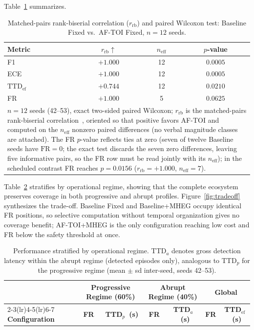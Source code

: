 \documentclass[a4paper,fleqn]{cas-dc}
\begin{document}
Table~\ref{tab:cliff_delta} summarizes.
\begin{table}[!tbp]
\centering
\caption{{\color{\revcolor}Matched-pairs rank-biserial correlation
($r_{\mathrm{rb}}$)} and paired Wilcoxon test: Baseline Fixed vs.\ \mbox{AF-TOI} Fixed{\color{\revcolor}, $n=12$ seeds}.}
\label{tab:cliff_delta}
\footnotesize
\setlength{\tabcolsep}{5pt}
\renewcommand{\arraystretch}{1.15}
{\color{\revcolor}
\begin{tabular}{l c c c}
\toprule
\textbf{Metric} & \textbf{$r_{\mathrm{rb}}$}$\uparrow$
  & \textbf{$n_{\mathrm{eff}}$} & \textbf{$p$-value} \\
\midrule
F1  & $+1.000$ & 12 & $0.0005$ \\
ECE & $+1.000$ & 12 & $0.0005$ \\
$\mathrm{TTD}_{\mathrm{ef}}$ & $+0.744$ & 12 & $0.0210$ \\
FR  & $+1.000$ & 5 & $0.0625$ \\
\bottomrule
\multicolumn{4}{p{0.94\columnwidth}}{\footnotesize $n=12$ seeds (42--53),
exact two-sided paired Wilcoxon; $r_{\mathrm{rb}}$ is the matched-pairs
rank-biserial correlation~\cite{kerby2014simple}, oriented so that positive
favors \mbox{AF-TOI} and computed on the $n_{\mathrm{eff}}$ nonzero paired
differences (no verbal magnitude classes are attached). The FR $p$-value
reflects ties at zero (seven of twelve Baseline seeds have $\mathrm{FR}=0$;
the exact test discards the seven zero differences, leaving five informative
pairs, so the FR row must be read jointly with its $n_{\mathrm{eff}}$); in
the scheduled contrast FR reaches $p=0.0156$
($r_{\mathrm{rb}}=+1.000$, $n_{\mathrm{eff}}=7$).}
\end{tabular}}
\end{table}
Table~\ref{tab:estratificado} stratifies by operational regime, showing that the complete ecosystem preserves coverage in both progressive and abrupt profiles. Figure~\ref{fig:tradeoff} synthesizes the trade-off. Baseline Fixed and Baseline+MHEG occupy identical FR positions, so selective computation without temporal organization gives no coverage benefit; \mbox{AF-TOI}+MHEG is the only configuration reaching low cost and FR below the safety threshold at once.
\begin{table}[!tbp]
\centering
\caption{Performance stratified by operational regime. TTD$_{a}$ denotes gross detection latency within the abrupt regime (detected episodes only), analogous to TTD$_{p}$ for the progressive regime
(mean $\pm$ sd inter-seed, {\color{\revcolor}seeds 42--53}).}
\label{tab:estratificado}
\footnotesize
\setlength{\tabcolsep}{5pt}
\renewcommand{\arraystretch}{1.22}
\begin{tabular}{l cc cc cc}
\toprule
& \multicolumn{2}{c}{\textbf{Progressive Regime (60\%)}}
& \multicolumn{2}{c}{\textbf{Abrupt Regime (40\%)}}
& \multicolumn{2}{c}{\textbf{Global}} \\
\cmidrule(lr){2-3}\cmidrule(lr){4-5}\cmidrule(lr){6-7}
\textbf{Configuration}
  & \textbf{FR} & \textbf{TTD$_{p}$~(s)}
  & \textbf{FR} & \textbf{TTD$_{a}$~(s)}
  & \textbf{FR} & \textbf{TTD$_{\mathrm{ef}}$~(s)} \\
\midrule

\end{tabular}
\end{table}
\end{document}
